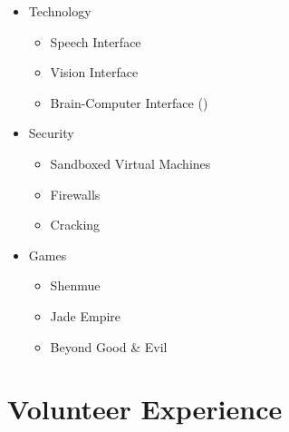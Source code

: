 \documentclass[12pt,a4paper,oneside]{article}
\newcommand{\sh}[1]{{\color{gray}{#1}}}
\begin{document}
\begin{itemize}
	\item Technology
		\begin{itemize}
			\item Speech Interface
			\item Vision Interface
			\item Brain-Computer Interface (\sh{OpenBCI})%
		\end{itemize}
	\item Security
		\begin{itemize}
			\item Sandboxed Virtual Machines
			\item Firewalls
			\item Cracking
		\end{itemize}
	\item Games
		\begin{itemize}
			\item Shenmue
			\item Jade Empire
			\item Beyond Good \& Evil
		\end{itemize}
\end{itemize}

\section{Volunteer Experience}
\end{document}
